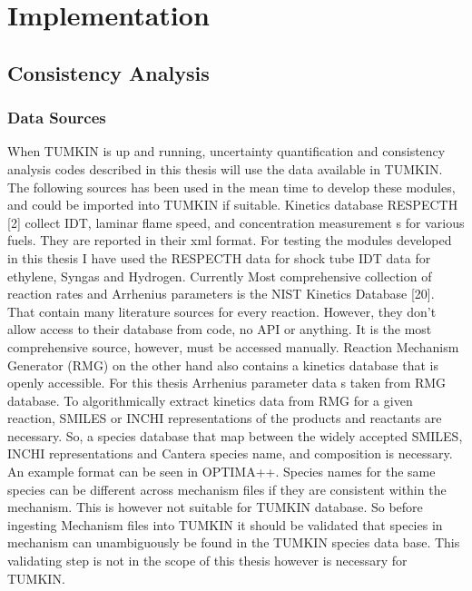 \chapter{Implementation}\label{Sec:Implementation}

\section{Consistency Analysis}

\subsection{Data Sources}
When TUMKIN is up  and running, uncertainty quantification and consistency analysis codes described in this thesis will use the data available in TUMKIN. The following sources has been used in the mean time to develop these modules, and  could be imported into TUMKIN if suitable. 
Kinetics database RESPECTH  [2] collect IDT, laminar flame speed, and concentration measurement s for various fuels. They are reported in their xml format.  For testing the modules developed in this thesis I have used the RESPECTH data for shock tube IDT data for ethylene, Syngas and Hydrogen. 
Currently Most comprehensive collection of reaction rates and Arrhenius parameters is the NIST Kinetics Database [20]. That contain many literature sources for every reaction. However, they don’t allow access to their database from code, no API or anything. It is the most comprehensive source, however, must be accessed manually. Reaction Mechanism Generator (RMG) on the other hand also contains a kinetics database that is openly accessible. For this thesis Arrhenius parameter data s taken from RMG database. To algorithmically extract kinetics data from RMG for a given reaction, SMILES or INCHI representations of the products and reactants are necessary. So, a species database that map between the widely accepted SMILES, INCHI representations and Cantera species name, and composition is necessary. An example format can be seen in OPTIMA++.  Species names for the same species can be different across mechanism files if they are consistent within the mechanism. This is however not suitable for TUMKIN database. So before ingesting Mechanism files into TUMKIN it should be validated that species in mechanism can unambiguously be found in the TUMKIN species data base. This validating step is not in the scope of this thesis however is necessary for TUMKIN.
\cite{verma_comprehensive_2021}

\cite{stocker_machine_2020}

